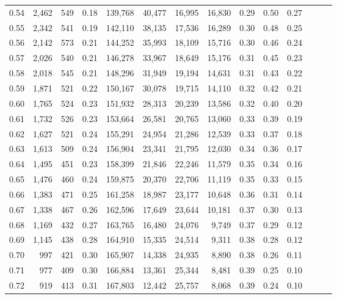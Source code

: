 \begin{tabular}{rrrrrrrrrrrrrr}
0.54 &  2,462 &  549 &  0.18 &  139,768 &   40,477 &  16,995 &  16,830 &  0.29 &  0.50 &      0.27 \\
0.55 &  2,342 &  541 &  0.19 &  142,110 &   38,135 &  17,536 &  16,289 &  0.30 &  0.48 &      0.25 \\
0.56 &  2,142 &  573 &  0.21 &  144,252 &   35,993 &  18,109 &  15,716 &  0.30 &  0.46 &      0.24 \\
0.57 &  2,026 &  540 &  0.21 &  146,278 &   33,967 &  18,649 &  15,176 &  0.31 &  0.45 &      0.23 \\
0.58 &  2,018 &  545 &  0.21 &  148,296 &   31,949 &  19,194 &  14,631 &  0.31 &  0.43 &      0.22 \\
0.59 &  1,871 &  521 &  0.22 &  150,167 &   30,078 &  19,715 &  14,110 &  0.32 &  0.42 &      0.21 \\
0.60 &  1,765 &  524 &  0.23 &  151,932 &   28,313 &  20,239 &  13,586 &  0.32 &  0.40 &      0.20 \\
0.61 &  1,732 &  526 &  0.23 &  153,664 &   26,581 &  20,765 &  13,060 &  0.33 &  0.39 &      0.19 \\
0.62 &  1,627 &  521 &  0.24 &  155,291 &   24,954 &  21,286 &  12,539 &  0.33 &  0.37 &      0.18 \\
0.63 &  1,613 &  509 &  0.24 &  156,904 &   23,341 &  21,795 &  12,030 &  0.34 &  0.36 &      0.17 \\
0.64 &  1,495 &  451 &  0.23 &  158,399 &   21,846 &  22,246 &  11,579 &  0.35 &  0.34 &      0.16 \\
0.65 &  1,476 &  460 &  0.24 &  159,875 &   20,370 &  22,706 &  11,119 &  0.35 &  0.33 &      0.15 \\
0.66 &  1,383 &  471 &  0.25 &  161,258 &   18,987 &  23,177 &  10,648 &  0.36 &  0.31 &      0.14 \\
0.67 &  1,338 &  467 &  0.26 &  162,596 &   17,649 &  23,644 &  10,181 &  0.37 &  0.30 &      0.13 \\
0.68 &  1,169 &  432 &  0.27 &  163,765 &   16,480 &  24,076 &   9,749 &  0.37 &  0.29 &      0.12 \\
0.69 &  1,145 &  438 &  0.28 &  164,910 &   15,335 &  24,514 &   9,311 &  0.38 &  0.28 &      0.12 \\
0.70 &    997 &  421 &  0.30 &  165,907 &   14,338 &  24,935 &   8,890 &  0.38 &  0.26 &      0.11 \\
0.71 &    977 &  409 &  0.30 &  166,884 &   13,361 &  25,344 &   8,481 &  0.39 &  0.25 &      0.10 \\
0.72 &    919 &  413 &  0.31 &  167,803 &   12,442 &  25,757 &   8,068 &  0.39 &  0.24 &      0.10 \\

\end{tabular}
